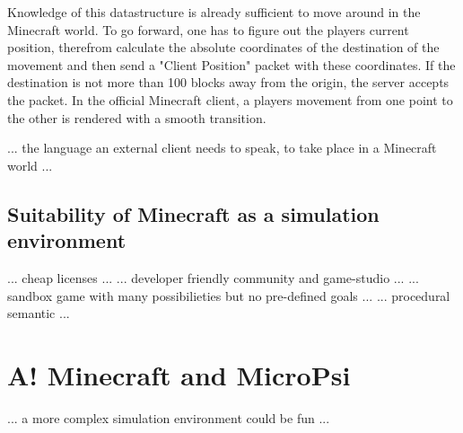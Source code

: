 Knowledge of this datastructure is already sufficient to move around in the Minecraft world. To go forward, one has to figure out the players current position, therefrom calculate the absolute coordinates of the destination of the movement and then send a "Client Position" packet with these coordinates. If the destination is not more than 100 blocks away from the origin, the server accepts the packet. In the official Minecraft client, a players movement from one point to the other is rendered with a smooth transition.

... the language an external client needs to speak, to take place in a Minecraft world ...

        \subsection{Suitability of Minecraft as a simulation environment}
... cheap licenses ...
... developer friendly community and game-studio ...
... sandbox game with many possibilieties but no pre-defined goals ...
... procedural semantic ...

    \section{A! Minecraft and MicroPsi}
... a more complex simulation environment could be fun ...